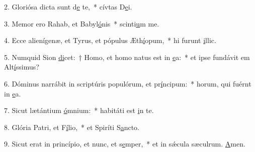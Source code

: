 2. Gloriósa dicta sunt d\uline{e} te,~* cívtas D\uline{e}i.\par 
3. Memor ero Rahab, et Babyl\uline{ó}nis~* scinti\uline{u}m me.\par 
4. Ecce alienígenæ, et Tyrus, et pópulus Æth\uline{í}opum,~* hi furunt \uline{i}llic.\par 
5. Numquid Sion \uline{di}cet:~† Homo, et homo natus est in \uline{e}a:~* et ipse fundávit em Alt\uline{í}ssimus?\par 
6. Dóminus narrábit in scriptúris populórum, et pr\uline{í}ncipum:~* horum, qui fuérnt in \uline{e}a.\par 
7. Sicut lætántium \uline{ó}mnium:~* habitáti est \uline{i}n te.\par 
8. Glória Patri, et F\uline{í}lio,~* et Spiríti S\uline{a}ncto.\par 
9. Sicut erat in princípio, et nunc, et s\uline{e}mper,~* et in sǽcula sæculrum. \uline{A}men.\par 
